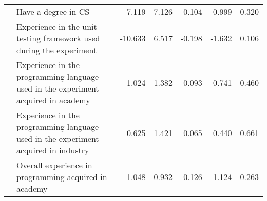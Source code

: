 \begin{table}[h]
{\begin{tabular}{|llrrrrr}
\multicolumn{1}{|l|}{}                                & \multicolumn{1}{l|}{Have a degree in CS}                                                            & \multicolumn{1}{r|}{-7.119}                  & \multicolumn{1}{r|}{7.126}                            & \multicolumn{1}{r|}{-0.104}                                                                        & \multicolumn{1}{r|}{-0.999}                      & \multicolumn{1}{r|}{0.320}                          \\ \cline{2-7} 
\multicolumn{1}{|l|}{}                                & \multicolumn{1}{l|}{Experience in the unit testing framework used during the experiment}                & \multicolumn{1}{r|}{-10.633}                 & \multicolumn{1}{r|}{6.517}                            & \multicolumn{1}{r|}{-0.198}                                                                        & \multicolumn{1}{r|}{-1.632}                      & \multicolumn{1}{r|}{0.106}                          \\ \cline{2-7} 
\multicolumn{1}{|l|}{}                                & \multicolumn{1}{l|}{Experience in the programming language used in the experiment acquired in academy}  & \multicolumn{1}{r|}{1.024}                   & \multicolumn{1}{r|}{1.382}                            & \multicolumn{1}{r|}{0.093}                                                                         & \multicolumn{1}{r|}{0.741}                       & \multicolumn{1}{r|}{0.460}                          \\ \cline{2-7} 
\multicolumn{1}{|l|}{}                                & \multicolumn{1}{l|}{Experience in the programming language used in the experiment acquired in industry} & \multicolumn{1}{r|}{0.625}                   & \multicolumn{1}{r|}{1.421}                            & \multicolumn{1}{r|}{0.065}                                                                         & \multicolumn{1}{r|}{0.440}                       & \multicolumn{1}{r|}{0.661}                          \\ \cline{2-7} 
\multicolumn{1}{|l|}{}                                & \multicolumn{1}{l|}{Overall experience in programming acquired in academy}                          & \multicolumn{1}{r|}{1.048}                   & \multicolumn{1}{r|}{0.932}                            & \multicolumn{1}{r|}{0.126}                                                                         & \multicolumn{1}{r|}{1.124}                       & \multicolumn{1}{r|}{0.263}                          \\ \cline{2-7} 

\end{tabular}}
\end{table}

